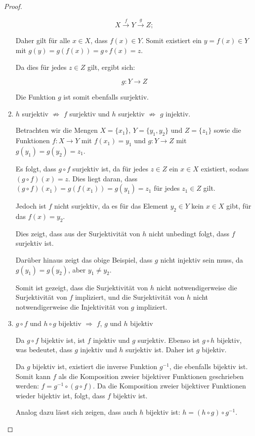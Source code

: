 \documentclass{../problemset}
\begin{document}
\begin{problem}
\begin{proof}
\begin{enumerate}
		      \[ X \overset{f}{\to} Y \overset{g}{\to} Z; \]

		      Daher gilt für alle \(x \in X\), dass \(f(x) \in Y\). Somit existiert ein \(y = f(x) \in Y\) mit \(g(y) = g(f(x)) = g \circ f(x) = z\).

		      Da dies für jedes \(z \in Z\) gilt, ergibt sich:

		      \[ g: Y \to Z \]

		      Die Funktion \(g\) ist somit ebenfalls surjektiv.

		\item $h$ surjektiv $\not\Rightarrow$ $f$ surjektiv und $h$ surjektiv $\not\Rightarrow$ $g$ injektiv.

		      Betrachten wir die Mengen $X = \{x_1\}$, $Y = \{y_1, y_2\}$ und $Z = \{z_1\}$ sowie die Funktionen $f: X \to Y$ mit $f(x_1) = y_1$ und $g: Y \to Z$ mit $g(y_1) = g(y_2) = z_1$.

		      Es folgt, dass $g \circ f$ surjektiv ist, da für jedes $z \in Z$ ein $x \in X$ existiert, sodass $(g \circ f)(x) = z$. Dies liegt daran, dass $(g \circ f)(x_1) = g(f(x_1)) = g(y_1) = z_1$ für jedes $z_1 \in Z$ gilt.

		      Jedoch ist $f$ nicht surjektiv, da es für das Element $y_2 \in Y$ kein $x \in X$ gibt, für das $f(x) = y_2$.

		      Dies zeigt, dass aus der Surjektivität von $h$ nicht unbedingt folgt, dass $f$ surjektiv ist.

		      Darüber hinaus zeigt das obige Beispiel, dass $g$ nicht injektiv sein muss, da $g(y_1) = g(y_2)$, aber $y_1 \neq y_2$.

		      Somit ist gezeigt, dass die Surjektivität von $h$ nicht notwendigerweise die Surjektivität von $f$ impliziert, und die Surjektivität von $h$ nicht notwendigerweise die Injektivität von $g$ impliziert. \checkmark

		\item $g \circ f$ und $h \circ g$ bijektiv $\Rightarrow$ $f$, $g$ und $h$ bijektiv

		      Da $g \circ f$ bijektiv ist, ist $f$ injektiv und $g$ surjektiv.
		      Ebenso ist $g \circ h$ bijektiv, was bedeutet, dass $g$ injektiv und $h$ surjektiv ist.
		      Daher ist $g$ bijektiv.

		      Da $g$ bijektiv ist, existiert die inverse Funktion $g^{-1}$, die ebenfalls bijektiv ist.
		      Somit kann $f$ als die Komposition zweier bijektiver Funktionen geschrieben werden: $f = g^{-1} \circ (g \circ f)$.
		      Da die Komposition zweier bijektiver Funktionen wieder bijektiv ist, folgt, dass $f$ bijektiv ist.

		      Analog dazu lässt sich zeigen, dass auch $h$ bijektiv ist: $h = (h \circ g) \circ g^{-1}$.

	\end{enumerate}
\end{proof}
\end{problem}
\end{document}

